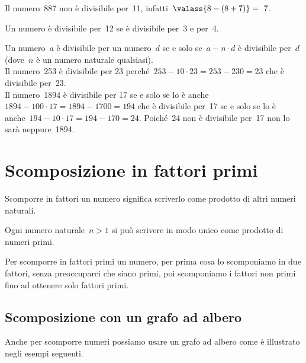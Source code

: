 \begin{description} [noitemsep]
Il numero~887 non è divisibile per~11, infatti~\(\valass{8-(8+7)}=~7\).
\item[12:~] Un numero è divisibile per~12 se è 
divisibile 
per~3 e per~4.
\item[un numero qualunque:~] Un numero~\(a\) è divisibile 
per un numero~\(d\) se e solo se~\(a - n \cdot d\) è divisibile per~\(d\) 
(dove~\(n\) è un numero naturale qualsiasi).\\
Il numero~253 è divisibile per 23 
perché~\(253 - 10 \cdot 23 = 253 - 230 = 23\) che è divisibile per~23.\\
Il numero~1894 è divisibile per 17 se e solo se lo è 
anche~\(1894 - 100 \cdot 17 = 1894 - 1700 = 194\) 
che è divisibile per~17 se e solo se lo è
anche~\(194 - 10 \cdot 17 = 194 - 170 = 24\). 
Poiché~24 non è divisibile per~17 non lo sarà neppure~1894.
\end{description}


\pagebreak

\section{Scomposizione in fattori primi}
\label{sec:nat_scomposizione}

Scomporre in fattori un numero significa scriverlo come prodotto di altri 
numeri naturali. 


\begin{teorema}
 Ogni numero naturale~\(n>1\) si può scrivere in modo unico come prodotto di 
 numeri primi.
\end{teorema}

Per scomporre in fattori primi un numero, per prima cosa lo scomponiamo in 
due fattori, senza preoccuparci che siano primi, poi scomponiamo i fattori
non primi fino ad ottenere solo fattori primi.

\subsection{Scomposizione con un grafo ad albero}

Anche per scomporre numeri possiamo usare un grafo ad albero come è 
illustrato negli esempi seguenti.


